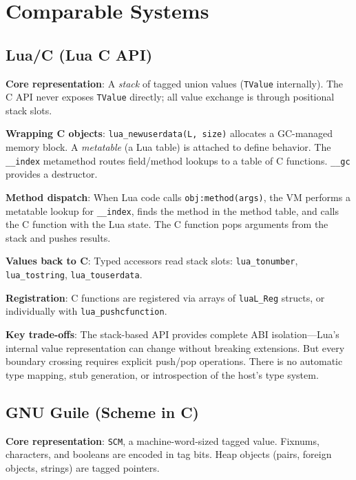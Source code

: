 \documentclass[11pt]{article}
\begin{document}
\section{Comparable Systems}
\label{sec:comparable}

\subsection{Lua/C (Lua C API)}
\label{sec:lua}

\textbf{Core representation}: A \emph{stack} of tagged union values
(\texttt{TValue} internally).  The C API never exposes \texttt{TValue}
directly; all value exchange is through positional stack slots.

\textbf{Wrapping C objects}: \texttt{lua\_newuserdata(L, size)}
allocates a GC-managed memory block.  A \emph{metatable} (a Lua
table) is attached to define behavior.  The \texttt{\_\_index}
metamethod routes field/method lookups to a table of C functions.
\texttt{\_\_gc} provides a destructor.

\textbf{Method dispatch}: When Lua code calls
\texttt{obj:method(args)}, the VM performs a metatable lookup for
\texttt{\_\_index}, finds the method in the method table, and calls
the C function with the Lua state.  The C function pops arguments from
the stack and pushes results.

\textbf{Values back to C}: Typed accessors read stack slots:
\texttt{lua\_tonumber}, \texttt{lua\_tostring},
\texttt{lua\_touserdata}.

\textbf{Registration}: C functions are registered via arrays of
\texttt{luaL\_Reg} structs, or individually with
\texttt{lua\_pushcfunction}.

\textbf{Key trade-offs}: The stack-based API provides complete ABI
isolation---Lua's internal value representation can change without
breaking extensions.  But every boundary crossing requires explicit
push/pop operations.  There is no automatic type mapping, stub
generation, or introspection of the host's type system.


\subsection{GNU Guile (Scheme in C)}
\label{sec:guile}

\textbf{Core representation}: \texttt{SCM}, a machine-word-sized
tagged value.  Fixnums, characters, and booleans are encoded in tag
bits.  Heap objects (pairs, foreign objects, strings) are tagged
pointers.
\end{document}
